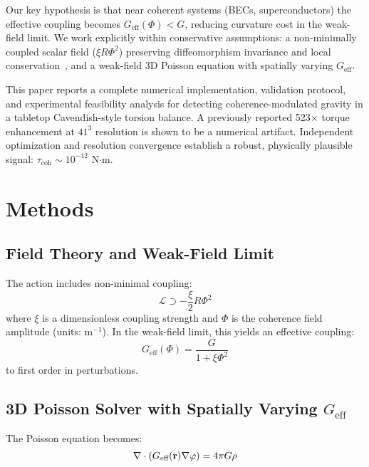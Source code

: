 \documentclass[10pt,twocolumn]{article}
\begin{document}
Our key hypothesis is that near coherent systems (BECs, superconductors) the effective coupling becomes $G_{\text{eff}}(\Phi) < G$, reducing curvature cost in the weak-field limit. We work explicitly within conservative assumptions: a non-minimally coupled scalar field ($\xi R \Phi^2$) preserving diffeomorphism invariance and local conservation~\cite{birrell1982,fujii2003}, and a weak-field 3D Poisson equation with spatially varying $G_{\text{eff}}$.

This paper reports a complete numerical implementation, validation protocol, and experimental feasibility analysis for detecting coherence-modulated gravity in a tabletop Cavendish-style torsion balance. A previously reported 523$\times$ torque enhancement at $41^3$ resolution is shown to be a numerical artifact. Independent optimization and resolution convergence establish a robust, physically plausible signal: $\tau_{\text{coh}} \sim 10^{-12}$ N$\cdot$m.

\section{Methods}

\subsection{Field Theory and Weak-Field Limit}

The action includes non-minimal coupling:
\begin{equation}
\mathcal{L} \supset -\frac{\xi}{2} R \Phi^2
\end{equation}
where $\xi$ is a dimensionless coupling strength and $\Phi$ is the coherence field amplitude (units: m$^{-1}$). In the weak-field limit, this yields an effective coupling:
\begin{equation}
G_{\text{eff}}(\Phi) = \frac{G}{1 + \xi \Phi^2}
\end{equation}
to first order in perturbations.

\subsection{3D Poisson Solver with Spatially Varying $G_{\text{eff}}$}

The Poisson equation becomes:
\begin{equation}
\nabla \cdot (G_{\text{eff}}({\bf r}) \nabla \varphi) = 4\pi G \rho
\label{eq:poisson}
\end{equation}
\end{document}
